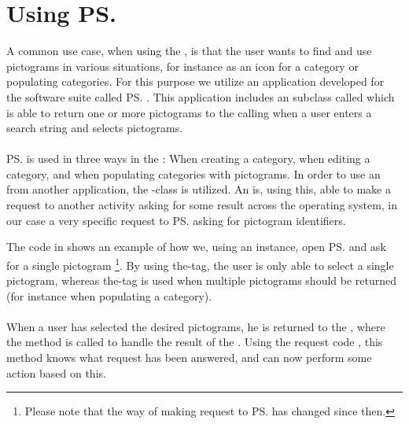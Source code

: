 
\section{Using \ps}
\label{sec:using_pictosearch}

A common use case, when using the \ct, is that the user wants to find and use pictograms in various situations, for instance as an icon for a category or populating categories. For this purpose we utilize an application developed for the \giraf software suite called \ps. This application includes an  subclass called  which is able to return one or more pictograms to the calling  when a user enters a search string and selects pictograms. 
\\\\
\ps is used in three ways in the \ct: When creating a category, when editing a category, and when populating categories with pictograms. In order to use an  from another application, the -class is utilized. An  is, using this, able to make a request to another activity asking for some result across the operating system, in our case a very specific request to \ps asking for pictogram identifiers. 



The code in  shows an example of how we, using an  instance, open \ps and ask for a single pictogram \footnote{Please note that the way of making request to \ps has changed since then.}. By using the\linebreak{}-tag, the user is only able to select a single pictogram, whereas the-tag is used when multiple pictograms should be returned (for instance when populating a category). 
\\\\
When a user has selected the desired pictograms, he is returned to the \ct, where the  method is called to handle the result of the . Using the request code , this method knows what request has been answered, and can now perform some action based on this.